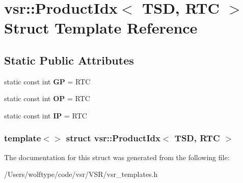 \hypertarget{structvsr_1_1_product_idx_3_01_t_s_d_00_01_r_t_c_01_4}{\section{vsr\-:\-:Product\-Idx$<$ T\-S\-D, R\-T\-C $>$ Struct Template Reference}
\label{structvsr_1_1_product_idx_3_01_t_s_d_00_01_r_t_c_01_4}
}
\subsection*{Static Public Attributes}
\begin{DoxyCompactItemize}
\item 
\hypertarget{structvsr_1_1_product_idx_3_01_t_s_d_00_01_r_t_c_01_4_ab2896ed522e03840c41ab76fbac37a1a}{static const int {\bfseries G\-P} = R\-T\-C}\label{structvsr_1_1_product_idx_3_01_t_s_d_00_01_r_t_c_01_4_ab2896ed522e03840c41ab76fbac37a1a}

\item 
\hypertarget{structvsr_1_1_product_idx_3_01_t_s_d_00_01_r_t_c_01_4_a6522a0ff5c3e772d641972fe697f202c}{static const int {\bfseries O\-P} = R\-T\-C}\label{structvsr_1_1_product_idx_3_01_t_s_d_00_01_r_t_c_01_4_a6522a0ff5c3e772d641972fe697f202c}

\item 
\hypertarget{structvsr_1_1_product_idx_3_01_t_s_d_00_01_r_t_c_01_4_ae9021056e7319019036faab572319bd6}{static const int {\bfseries I\-P} = R\-T\-C}\label{structvsr_1_1_product_idx_3_01_t_s_d_00_01_r_t_c_01_4_ae9021056e7319019036faab572319bd6}

\end{DoxyCompactItemize}
\subsubsection*{template$<$$>$ struct vsr\-::\-Product\-Idx$<$ T\-S\-D, R\-T\-C $>$}



The documentation for this struct was generated from the following file\-:\begin{DoxyCompactItemize}
\item 
/\-Users/wolftype/code/vsr/\-V\-S\-R/vsr\-\_\-templates.\-h\end{DoxyCompactItemize}
